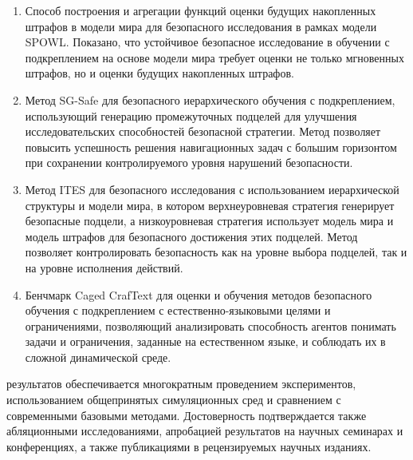{}
\begin{enumerate}[beginpenalty=10000]
  \item Способ построения и агрегации функций оценки будущих накопленных штрафов в модели мира для безопасного исследования в рамках модели SPOWL. Показано, что устойчивое безопасное исследование в обучении с подкреплением на основе модели мира требует оценки не только мгновенных штрафов, но и оценки будущих накопленных штрафов.
  \item Метод SG-Safe для безопасного иерархического обучения с подкреплением, использующий генерацию промежуточных подцелей для улучшения исследовательских способностей безопасной стратегии. Метод позволяет повысить успешность решения навигационных задач с большим горизонтом при сохранении контролируемого уровня нарушений безопасности.
  \item Метод ITES для безопасного исследования с использованием иерархической структуры и модели мира, в котором верхнеуровневая стратегия генерирует безопасные подцели, а низкоуровневая стратегия использует модель мира и модель штрафов для безопасного достижения этих подцелей. Метод позволяет контролировать безопасность как на уровне выбора подцелей, так и на уровне исполнения действий.
  \item Бенчмарк Caged CrafText для оценки и обучения методов безопасного обучения с подкреплением с естественно-языковыми целями и ограничениями, позволяющий анализировать способность агентов понимать задачи и ограничения, заданные на естественном языке, и соблюдать их в сложной динамической среде.
\end{enumerate}

{\reliability} результатов обеспечивается многократным проведением экспериментов, использованием общепринятых симуляционных сред и сравнением с современными базовыми методами. Достоверность подтверждается также абляционными исследованиями, апробацией результатов на научных семинарах и конференциях, а также публикациями в рецензируемых научных изданиях.

